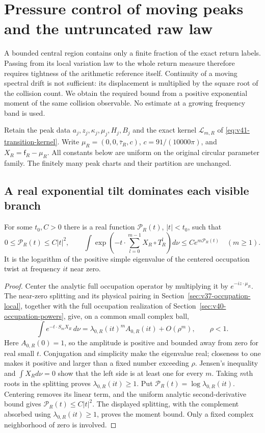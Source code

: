 \section{Pressure control of moving peaks and the untruncated raw law}
\label{sec:v57-transition-tails}
A bounded central region contains only a finite fraction of the exact
return labels. Passing from its local variation law to the whole return
measure therefore requires tightness of the arithmetic reference itself.
Continuity of a moving spectral drift is not sufficient: its displacement
is multiplied by the square root of the collision count. We obtain the
required bound from a positive exponential moment of the same collision
observable. No estimate at a growing frequency band is used.

Retain the peak data $a_j,z_j,\kappa_j,\mu_j,H_j,B_j$ and the exact
kernel $\mathcal L_{m,R}$ of \eqref{eq:v41-transition-kernel}. Write
$\mu_R=(0,0,\bar\tau_R,c)$, $c=91/(10000\pi)$, and
$X_R=\mathsf f_R-\mu_R$. All constants below are uniform on the
original circular parameter family. The finitely many peak charts and
their partition are unchanged.

\subsection{A real exponential tilt dominates each visible branch}
\begin{lemma}
\label{lem:v57-centered-pressure}
For some $t_0,C>0$ there is a real function $\mathscr P_R(t)$,
$|t|<t_0$, such that
\begin{equation}\label{eq:v57-positive-pressure}
 0\le\mathscr P_R(t)\le C|t|^2,\qquad
 \int\exp\left(-t\cdot\sum_{l=0}^{m-1}X_R\circ T_R^l\right)d\nu
                       \le C e^{m\mathscr P_R(t)}\quad(m\ge1).
\end{equation}
It is the logarithm of the positive simple eigenvalue of the centered
occupation twist at frequency $it$ near zero.
\end{lemma}
\begin{proof}
Center the analytic full occupation operator by multiplying it by
$e^{-iz\cdot\mu_R}$. The near-zero splitting and its physical pairing
in Section~\ref{sec:v37-occupation-local}, together with the full
occupation realization of Section~\ref{sec:v40-occupation-powers},
give, on a common small complex ball,
\[
 \int e^{-t\cdot S_mX_R}\,d\nu
       =\lambda_{0,R}(it)^m A_{0,R}(it)+O(\rho^m),\qquad \rho<1.
\]
Here $A_{0,R}(0)=1$, so the amplitude is positive and bounded away
from zero for real small $t$. Conjugation and simplicity make the
eigenvalue real; closeness to one makes it positive and larger than
a fixed number exceeding $\rho$. Jensen's inequality and
$\int X_Rd\nu=0$ show that the left side is at least one for every
$m$. Taking $m$th roots in the splitting proves
$\lambda_{0,R}(it)\ge1$. Put
$\mathscr P_R(t)=\log\lambda_{0,R}(it)$. Centering removes its
linear term, and the uniform analytic second-derivative bound gives
$\mathscr P_R(t)\le C|t|^2$. The displayed splitting, with the
complement absorbed using $\lambda_{0,R}(it)\ge1$, proves the
moment bound. Only a fixed complex neighborhood of zero is involved.
\end{proof}

